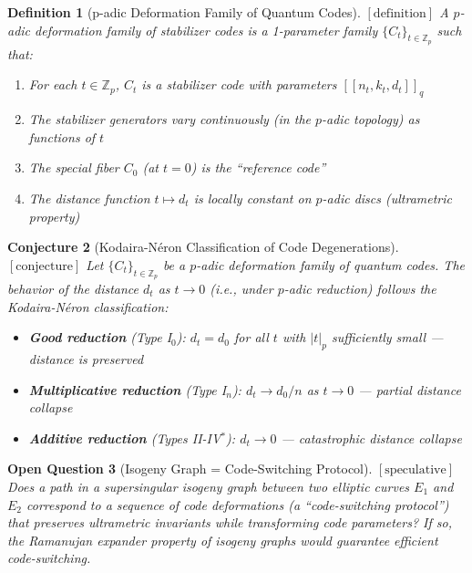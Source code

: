 \documentclass[12pt]{article}
\newtheorem{definition}{Definition}[section]
\newtheorem{conjecture}[definition]{Conjecture}
\newtheorem{question}[definition]{Open Question}
\theoremstyle{remark}
\begin{document}
\begin{definition}[p-adic Deformation Family of Quantum Codes]
$[\text{definition}]$
A \emph{$p$-adic deformation family} of stabilizer codes is a 1-parameter
family $\{C_t\}_{t \in \mathbb{Z}_p}$ such that:
\begin{enumerate}
\item For each $t \in \mathbb{Z}_p$, $C_t$ is a stabilizer code with
  parameters $[[n_t, k_t, d_t]]_q$
\item The stabilizer generators vary continuously (in the $p$-adic topology)
  as functions of $t$
\item The special fiber $C_0$ (at $t=0$) is the ``reference code''
\item The distance function $t \mapsto d_t$ is locally constant on $p$-adic
  discs (ultrametric property)
\end{enumerate}
\end{definition}

\begin{conjecture}[Kodaira-N\'eron Classification of Code Degenerations]
$[\text{conjecture}]$
Let $\{C_t\}_{t \in \mathbb{Z}_p}$ be a $p$-adic deformation family of
quantum codes. The behavior of the distance $d_t$ as $t \to 0$ (i.e., under
$p$-adic reduction) follows the Kodaira-N\'eron classification:
\begin{itemize}
\item \textbf{Good reduction} (Type I$_0$): $d_t = d_0$ for all $t$ with
  $|t|_p$ sufficiently small — distance is preserved
\item \textbf{Multiplicative reduction} (Type I$_n$): $d_t \to d_0/n$ as
  $t \to 0$ — partial distance collapse
\item \textbf{Additive reduction} (Types II-IV$^*$): $d_t \to 0$ —
  catastrophic distance collapse
\end{itemize}
\end{conjecture}

\begin{question}[Isogeny Graph = Code-Switching Protocol]
$[\text{speculative}]$
Does a path in a supersingular isogeny graph between two elliptic curves
$E_1$ and $E_2$ correspond to a sequence of code deformations (a
``code-switching protocol'') that preserves ultrametric invariants while
transforming code parameters? If so, the Ramanujan expander property of
isogeny graphs would guarantee efficient code-switching.
\end{question}

\end{document}
